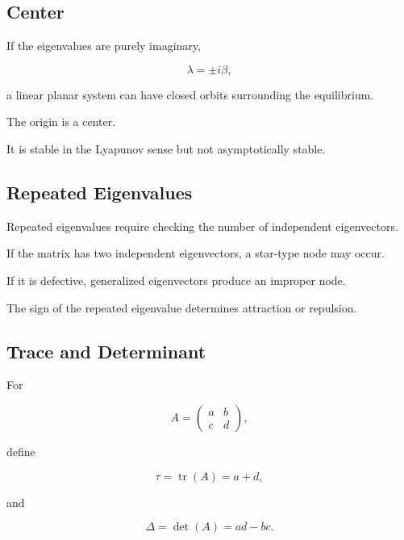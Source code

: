 \subsection{Center}
\label{subsec:dynamical-center}

If the eigenvalues are purely imaginary,

\[
\boxed{
\lambda
=
\pm i\beta,
}
\]

a linear planar system can have closed orbits surrounding the equilibrium.

The origin is a center.

It is stable in the Lyapunov sense but not asymptotically stable.

\subsection{Repeated Eigenvalues}
\label{subsec:dynamical-repeated-eigenvalues}

Repeated eigenvalues require checking the number of independent
eigenvectors.

If the matrix has two independent eigenvectors, a star-type node may
occur.

If it is defective, generalized eigenvectors produce an improper node.

The sign of the repeated eigenvalue determines attraction or repulsion.

\subsection{Trace and Determinant}
\label{subsec:dynamical-trace-determinant}

For

\[
A
=
\begin{pmatrix}
a&b\\
c&d
\end{pmatrix},
\]

define

\[
\boxed{
\tau
=
\operatorname{tr}(A)
=
a+d,
}
\]

and

\[
\boxed{
\Delta
=
\det(A)
=
ad-bc.
}
\]

